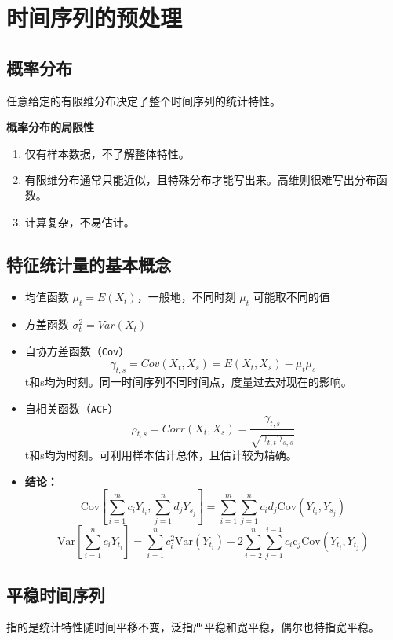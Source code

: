 \documentclass{article} %
\begin{document}
\clearpage %


\tableofcontents
\listoffigures
\listoftables
\newpage


\section{时间序列的预处理}
\subsection{概率分布}
任意给定的有限维分布决定了整个时间序列的统计特性。

\textbf{概率分布的局限性}
\begin{enumerate}
    \item 仅有样本数据，不了解整体特性。
    \item 有限维分布通常只能近似，且特殊分布才能写出来。高维则很难写出分布函数。
    \item 计算复杂，不易估计。
\end{enumerate}

\subsection{特征统计量的基本概念}
\begin{itemize}
\item 均值函数
  \(\mu_t=E(X_t)\)，一般地，不同时刻 \(\mu_t\) 可能取不同的值
\item 方差函数
  \(\sigma_t^2=Var(X_t)\)
\item 自协方差函数（\texttt{Cov}）
  \[
  \gamma_{t,s}=Cov(X_t,X_s)=E(X_t,X_s)-\mu_t\mu_s
  \]
  t和s均为时刻。同一时间序列不同时间点，度量过去对现在的影响。
\item 自相关函数（\texttt{ACF}）
  \[
  \rho_{t,s}=Corr(X_{t},X_{s})=\frac{\gamma_{t,s}}{\sqrt{\gamma_{t,t}\gamma_{s,s}}}
  \]
  t和s均为时刻。可利用样本估计总体，且估计较为精确。
  
\item \textbf{结论：}
  \[
  \mathrm{Cov}\left[\sum_{i=1}^{m}c_{i}Y_{t_{i}} ,\sum_{j=1}^{n}d_{j}Y_{s_{j}}\right]=\sum_{i=1}^{m}\sum_{j=1}^{n}c_{i}d_{j}\mathrm{Cov}(Y_{t_{i}},Y_{s_{j}})
  \]
  \[
  \mathrm{Var}\left[ \sum_{i=1}^{n}c_{i}Y_{t_{i}}\right]= \sum_{i=1}^{n}c_{i}^{2} \mathrm{Var}(Y_{t_{i}})+2\sum_{i=2}^{n}\sum_{j=1}^{i-1}c_{i}\mathrm{c}_{j}\mathrm{Cov}(Y_{t_{i}},Y_{t_{j}})
  \]
\end{itemize}

\subsection{平稳时间序列}
指的是统计特性随时间平移不变，泛指严平稳和宽平稳，偶尔也特指宽平稳。
\end{document}
